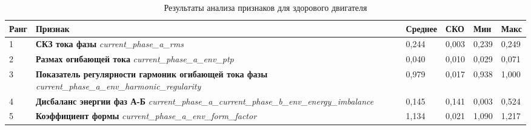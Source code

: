 \renewcommand{\arraystretch}{1.3}

\begin{table}[htbp]
\centering
\caption{Результаты анализа признаков для здорового двигателя}
\label{tab:healthy_motor_features}
\begin{tabular}{p{1cm} p{6cm} p{1.5cm} p{1.5cm} p{1.5cm} p{1.5cm}}
\toprule
\textbf{Ранг} & 
\textbf{Признак} &
\textbf{Среднее} & 
\textbf{СКО} &
\textbf{Мин} &
\textbf{Макс} \\
\midrule

1 & 
\textbf{СКЗ тока фазы} \newline
\textit{current\_phase\_a\_rms} & 
0,244 & 0,003 & 0,239 & 0,249 \\
\midrule

2 & 
\textbf{Размах огибающей тока} \newline
\textit{current\_phase\_a\_env\_ptp} & 
0,040 & 0,010 & 0,029 & 0,071 \\
\midrule

3 & 
\textbf{Показатель регулярности гармоник огибающей тока фазы} \newline
\textit{current\_phase\_a\_env\_harmonic\_regularity} & 
0,979 & 0,017 & 0,938 & 1,000 \\
\midrule

4 & 
\textbf{Дисбаланс энергии фаз А-Б} \newline
\textit{current\_phase\_a\_current\_phase\_b\_env\_energy\_imbalance} & 
0,145 & 0,141 & 0,003 & 0,524 \\
\midrule

5 & 
\textbf{Коэффициент формы} \newline
\textit{current\_phase\_a\_env\_form\_factor} & 
1,134 & 0,021 & 1,090 & 1,217 \\

\bottomrule
\end{tabular}
\end{table}

